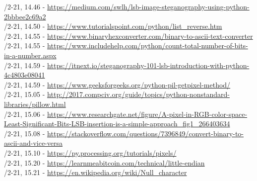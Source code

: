 \documentclass[10pt]{report}
\begin{document}
/2-21, 14.46 - \href{https://medium.com/swlh/lsb-image-steganography-using-python-2bbbee2c69a2}{https://medium.com/swlh/lsb-image-steganography-using-python-2bbbee2c69a2}\\
/2-21, 14.50 - \href{https://www.tutorialspoint.com/python/list_reverse.htm}{https://www.tutorialspoint.com/python/list\_reverse.htm}\\
/2-21, 14.55 - \href{https://www.binaryhexconverter.com/binary-to-ascii-text-converter}{https://www.binaryhexconverter.com/binary-to-ascii-text-converter}\\
/2-21, 14.55 - \href{https://www.includehelp.com/python/count-total-number-of-bits-in-a-number.aspx}{https://www.includehelp.com/python/count-total-number-of-bits-in-a-number.aspx}\\
/2-21, 14.59 - \href{https://itnext.io/steganography-101-lsb-introduction-with-python-4c4803e08041}{https://itnext.io/steganography-101-lsb-introduction-with-python-4c4803e08041}\\
/2-21, 14.59 - \href{https://www.geeksforgeeks.org/python-pil-getpixel-method/}{https://www.geeksforgeeks.org/python-pil-getpixel-method/}\\
/2-21, 15.05 - \href{http://2017.compciv.org/guide/topics/python-nonstandard-libraries/pillow.html}{http://2017.compciv.org/guide/topics/python-nonstandard-libraries/pillow.html}\\
/2-21, 15.06 - \href{https://www.researchgate.net/figure/A-pixel-in-RGB-color-space-Least-Significant-Bits-LSB-insertion-is-a-simple-approach_fig1_266403634}{https://www.researchgate.net/figure/A-pixel-in-RGB-color-space-Least-Significant-Bits-LSB-insertion-is-a-simple-approach\_fig1\_266403634}\\
/2-21, 15.08 - \href{https://stackoverflow.com/questions/7396849/convert-binary-to-ascii-and-vice-versa}{https://stackoverflow.com/questions/7396849/convert-binary-to-ascii-and-vice-versa}\\
/2-21, 15.10 - \href{https://py.processing.org/tutorials/pixels/}{https://py.processing.org/tutorials/pixels/}\\
/2-21, 15.20 - \href{https://learnmeabitcoin.com/technical/little-endian}{https://learnmeabitcoin.com/technical/little-endian}\\
/2-21, 15.21 - \href{https://en.wikipedia.org/wiki/Null_character}{https://en.wikipedia.org/wiki/Null\_character}\\
\end{document}
